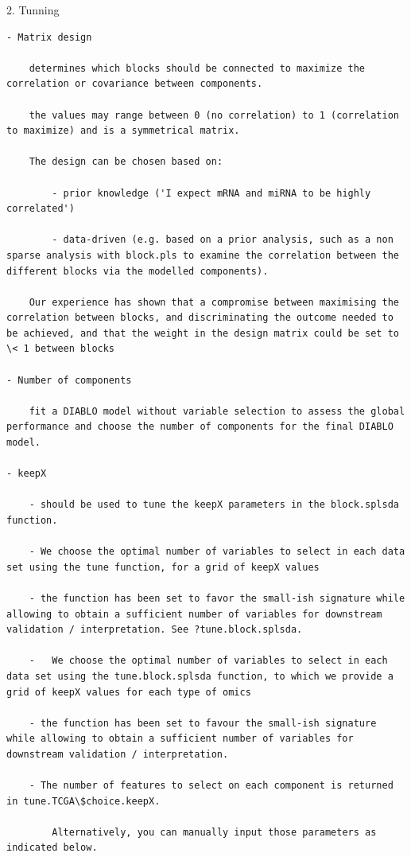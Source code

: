\documentclass[
]{book}
\begin{document}
2. Tunning

\begin{verbatim}
- Matrix design

    determines which blocks should be connected to maximize the correlation or covariance between components.

    the values may range between 0 (no correlation) to 1 (correlation to maximize) and is a symmetrical matrix.

    The design can be chosen based on:

        - prior knowledge ('I expect mRNA and miRNA to be highly correlated')

        - data-driven (e.g. based on a prior analysis, such as a non sparse analysis with block.pls to examine the correlation between the different blocks via the modelled components).

    Our experience has shown that a compromise between maximising the correlation between blocks, and discriminating the outcome needed to be achieved, and that the weight in the design matrix could be set to \< 1 between blocks

- Number of components

    fit a DIABLO model without variable selection to assess the global performance and choose the number of components for the final DIABLO model.

- keepX

    - should be used to tune the keepX parameters in the block.splsda function.

    - We choose the optimal number of variables to select in each data set using the tune function, for a grid of keepX values

    - the function has been set to favor the small-ish signature while allowing to obtain a sufficient number of variables for downstream validation / interpretation. See ?tune.block.splsda.

    -   We choose the optimal number of variables to select in each data set using the tune.block.splsda function, to which we provide a grid of keepX values for each type of omics

    - the function has been set to favour the small-ish signature while allowing to obtain a sufficient number of variables for downstream validation / interpretation.

    - The number of features to select on each component is returned in tune.TCGA\$choice.keepX.

        Alternatively, you can manually input those parameters as indicated below.
\end{verbatim}
\end{document}
